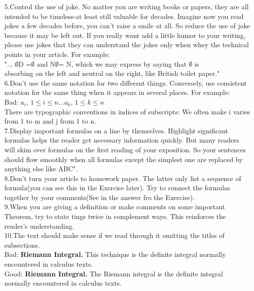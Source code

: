 \documentclass[]{article}
\begin{document}
	\noindent5.Control the use of joke. No matter you are writing books or papers, they are all intended to be timeless-at least still valuable for decades. Imagine now you read jokes a few decades before, you can't raise a smile at all. So reduce the use of joke because it may be left out. If you really want add a little humor to your writing, please use jokes that they can understand the jokes only when whey the technical points in your article. For example:\\
	\indent "... $\emptyset$D =$\emptyset$  and N$\emptyset$= N, which we may express by saying that $\emptyset$ is\\\indent absorbing on the left and neutral on the right, like British toilet paper."\\
	
	\noindent6.Don't use the same notation for two different things. Conversely, use consistent notation for the same thing when it appears in several places. For example:\\
	\indent Bad: $a_i$, $1\leq i\leq n$...$a_k$, $1\leq k\leq n$\\
	There are typographic conventions in indices of subscripts: We often make i varies from 1 to m and j from 1 to n.\\
	
	\noindent7.Display important formulas on a line by themselves. Highlight significant formulas helps the reader get necessary information quickly. But many readers will skim over formulas on the first reading of your exposition. So your sentences should flow smoothly when all formulas except the simplest one are replaced by anything else like ABC".\\
	
	\noindent8.Don't turn your article to homework paper. The latter only list a sequence of formula(you can see this in the Exercise later). Try to connect the formulas together by your comments(See in the answer fro the Exercise).\\
	
	\noindent9.When you are giving a definition or make comments on some important Theorem, try to state tings twice in complement ways. This reinforces the reader's understanding.\\
	
	\noindent10.The text should make sense if we read through it omitting the titles of subsections.\\
	\indent Bad: \textbf{Riemann Integral.} This technique is the definite integral normally encountered in calculus texts.\\
	\indent Good: \textbf{Riemann Integral.} The Riemann integral is the definite integral normally encountered in calculus texts.\\
	
\end{document}
